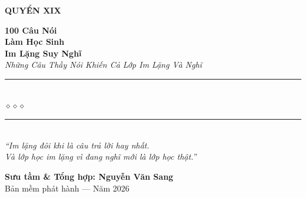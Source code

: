 \begin{titlepage}
\begin{center}
  \begin{tcolorbox}[
    width=6.5cm,
    colback=silver!20,
    colframe=silver!80!black,
    arc=4pt,
    boxrule=1.5pt,
    halign=center
  ]
    {\fontsize{18}{22}\selectfont\bfseries\color{inkdark!80!black}
     QUYỂN XIX}
  \end{tcolorbox}
  \vspace{0.8cm}

  {\fontsize{28}{34}\selectfont\bfseries\color{inkdark!80!black}
    100 Câu Nói}\\[0.4cm]
  {\fontsize{28}{34}\selectfont\bfseries\color{silver!80!black}
    Làm Học Sinh}\\[0.4cm]
  {\fontsize{28}{34}\selectfont\bfseries\color{inkdark!80!black}
    Im Lặng Suy Nghĩ}\\[0.4cm]

  {\fontsize{16}{20}\selectfont\color{silver!90!black}\itshape
    Những Câu Thầy Nói Khiến Cả Lớp Im Lặng Và Nghĩ}\\[1cm]

  {\color{deepnavy!60}\rule{6cm}{1pt}}\\[5pt]
  {\color{silver!80!black}\large$\diamond$\hspace{1cm}$\diamond$\hspace{1cm}$\diamond$}\\[5pt]
  {\color{deepnavy!60}\rule{6cm}{1pt}}\\[1.5cm]

  {\normalsize\itshape\color{deepnavy!90!black}
   ``Im lặng đôi khi là câu trả lời hay nhất.\\
   Và lớp học im lặng vì đang nghĩ mới là lớp học thật.''}

  \vfill

  {\fontsize{16}{20}\selectfont\bfseries\color{deepnavy!90!black}
    Sưu tầm \& Tổng hợp: \textbf{Nguyễn Văn Sang}}\\[0.4cm]

  {\small\color{gray} Bản mềm phát hành --- Năm 2026}\\[0.5cm]
\end{center}

\afterpage{\nopagecolor}
\end{titlepage}